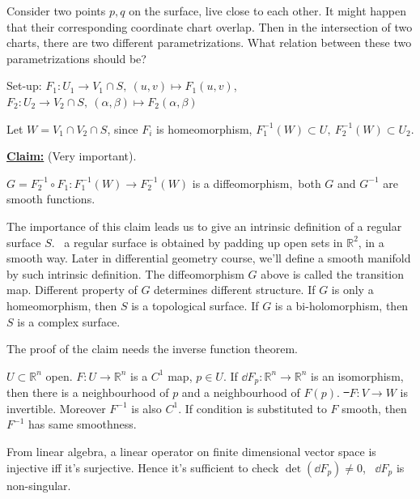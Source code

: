 \begin{question}
    Consider two points \(p,q\) on the surface, live close to each other. It might
    happen that their corresponding coordinate chart overlap. Then in the
    intersection of two charts, there are two different parametrizations. What
    relation between these two parametrizations should be?
\end{question}

Set-up: \(F_1\colon U_1\to V_1\cap S,\ (u,v)\mapsto F_1(u,v)\),\hfill \(F_2\colon
U_2\to V_2\cap S,\ (\alpha,\beta)\mapsto F_2(\alpha,\beta)\)

Let \(W=V_1\cap V_2\cap S\), since \(F_i\) is homeomorphism, \(F_1^{-1}(W)\subset U,
\ F_2^{-1}(W)\subset U_2\).

\noindent\underline{\textbf{Claim:}} (Very important).\par
\(G=F_2^{-1}\circ F_1\colon F_1^{-1}(W)\to F_2^{-1}(W)\) is a diffeomorphism,\ie\ 
both \(G\) and \(G^{-1}\) are smooth functions.

The importance of this claim leads us to give an intrinsic definition of a regular
surface \(S\). \ie\ a regular surface is obtained by padding up open sets in
\(\mathbb{R}^2\), in a smooth way. Later in differential geometry course, we'll
define a smooth manifold by such intrinsic definition. The diffeomorphism \(G\)
above is called the transition map. Different property of \(G\) determines different
structure. If \(G\) is only a homeomorphism, then \(S\) is a topological surface.
If \(G\) is a bi-holomorphism, then \(S\) is a complex surface.

The proof of the claim needs the inverse function theorem.
\begin{theorem}
    \(U\subset \mathbb{R}^n\) open. \(F\colon U\to \mathbb{R}^n\) is a \(C^1\) map,
    \(p\in U\). If \(\dd{F_p}\colon \mathbb{R}^n\to \mathbb{R}^n\) is an isomorphism,
    then there is a neighbourhood of \(p\) and a neighbourhood of \(F(p)\).
    \st\ \(F\colon V\to W\) is invertible. Moreover \(F^{-1}\) is also \(C^1\). If
    condition is substituted to \(F\) smooth, then \(F^{-1}\) has same smoothness.
\end{theorem}

\begin{remark}
    From linear algebra, a linear operator on finite dimensional vector space
    is injective iff it's surjective. Hence it's sufficient to check \(\det(\dd{F_p})
    \neq 0\), \ie\ \(\dd{F_p}\) is non-singular.
\end{remark}

